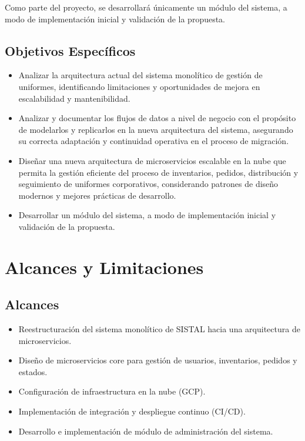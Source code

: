 Como parte del proyecto, se desarrollará únicamente un módulo del sistema, a modo de implementación inicial y validación de la propuesta.


\subsection{Objetivos Específicos}

\begin{itemize}
    \item Analizar la arquitectura actual del sistema monolítico de gestión de uniformes, identificando limitaciones y oportunidades de mejora en escalabilidad y mantenibilidad.
    \item Analizar y documentar los flujos de datos a nivel de negocio con el propósito de modelarlos y replicarlos en la nueva arquitectura del sistema, asegurando su correcta adaptación y continuidad operativa en el proceso de migración.
    \item Diseñar una nueva arquitectura de microservicios escalable en la nube que permita la gestión eficiente del proceso de inventarios, pedidos, distribución y seguimiento de uniformes corporativos, considerando patrones de diseño modernos y mejores prácticas de desarrollo.
    \item Desarrollar un módulo del sistema, a modo de implementación inicial y validación de la propuesta.
\end{itemize}


\section{Alcances y Limitaciones}

\subsection{Alcances}

\begin{itemize}
    \item Reestructuración del sistema monolítico de SISTAL hacia una arquitectura de microservicios.
    \item Diseño de microservicios core para gestión de usuarios, inventarios, pedidos y estados.
    \item Configuración de infraestructura en la nube (GCP).
    \item Implementación de integración y despliegue continuo (CI/CD).
    \item Desarrollo e implementación de módulo de administración del sistema.
\end{itemize}

